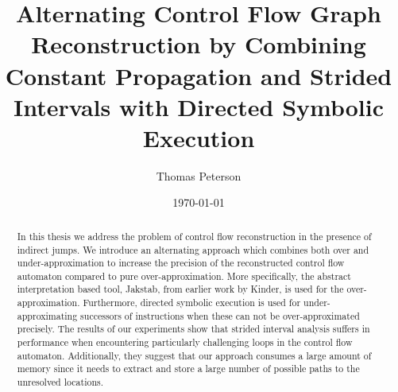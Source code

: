 \documentclass{kththesis}
\title{Alternating Control Flow Graph Reconstruction by Combining Constant Propagation and Strided Intervals with Directed Symbolic Execution}
\author{Thomas Peterson}
\date{\today}
\begin{document}
\frontmatter
{}

\titlepage

\begin{abstract}
In this thesis we address the problem of control flow reconstruction in the presence of indirect jumps. We introduce an alternating approach which combines both over and under-approximation to increase the precision of the reconstructed control flow automaton compared to pure over-approximation. More specifically, the abstract interpretation based tool, Jakstab, from earlier work by Kinder, is used for the over-approximation. Furthermore, directed symbolic execution is used for under-approximating successors of instructions when these can not be over-approximated precisely. The results of our experiments show that strided interval analysis suffers in performance when encountering particularly challenging loops in the control flow automaton. Additionally, they suggest that our approach consumes a large amount of memory since it needs to extract and store a large number of possible paths to the unresolved locations. 
\end{abstract}
\end{document}
